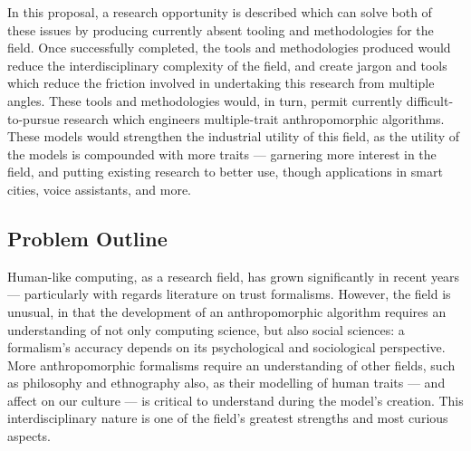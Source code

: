 In this proposal, a research opportunity is described which can solve both of these issues by producing currently absent tooling and methodologies for the field. Once successfully completed, the tools and methodologies produced would reduce the interdisciplinary complexity of the field, and create jargon and tools which reduce the friction involved in undertaking this research from multiple angles. These tools and methodologies would, in turn, permit currently difficult-to-pursue research which engineers multiple-trait anthropomorphic algorithms. These models would strengthen the industrial utility of this field, as the utility of the models is compounded with more traits --- garnering more interest in the field, and putting existing research to better use, though applications in smart cities, voice assistants, and more.\par

\subsection*{Problem Outline}\label{sec:problem_outline}




Human-like computing, as a research field, has grown significantly in recent years --- particularly with regards literature on trust formalisms. However, the field is unusual, in that the development of an anthropomorphic algorithm requires an understanding of not only computing science, but also social sciences: a formalism's accuracy depends on its psychological and sociological perspective. More anthropomorphic formalisms require an understanding of other fields, such as philosophy and ethnography also, as their modelling of human traits --- and affect on our culture --- is critical to understand during the model's creation. This interdisciplinary nature is one of the field's greatest strengths and most curious aspects.\par

